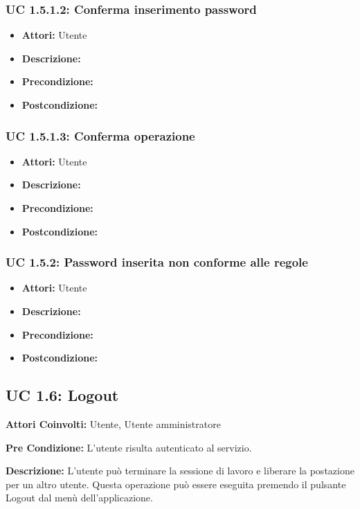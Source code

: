 \subsubsection{UC 1.5.1.2: Conferma inserimento password }

\begin{itemize}
\item \textbf{Attori:} Utente
\item \textbf{Descrizione:} 
\item \textbf{Precondizione:} 
\item \textbf{Postcondizione:} 
\end{itemize}

\subsubsection{UC 1.5.1.3: Conferma operazione}

\begin{itemize}
\item \textbf{Attori:} Utente
\item \textbf{Descrizione:} 
\item \textbf{Precondizione:} 
\item \textbf{Postcondizione:} 
\end{itemize}

\subsubsection{UC 1.5.2: Password inserita non conforme alle regole}

\begin{itemize}
\item \textbf{Attori:} Utente
\item \textbf{Descrizione:} 
\item \textbf{Precondizione:} 
\item \textbf{Postcondizione:} 
\end{itemize}

\subsection{UC 1.6: Logout}

\textbf{Attori Coinvolti:}
Utente, Utente amministratore

\textbf{Pre Condizione:}
L'utente risulta autenticato al servizio.

\textbf{Descrizione:}
L'utente può terminare la sessione di lavoro e liberare la postazione per un altro utente.
Questa operazione può essere eseguita premendo il pulsante Logout dal menù dell'applicazione.

